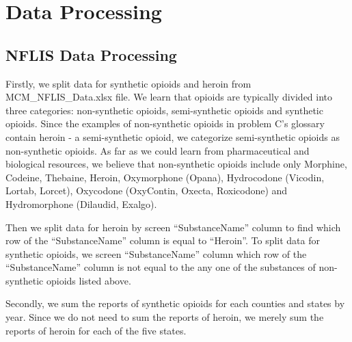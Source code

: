\documentclass{mcmthesis}
\numberwithin{equation}{section}
\numberwithin{figure}{section}
\numberwithin{table}{section}
\theoremstyle{mydef}
\newtheorem{mydef}{Definition}[section]
\begin{document}
%
%

\section{Data Processing}

\subsection{NFLIS Data Processing}

Firstly, we split data for synthetic opioids and heroin from MCM\_NFLIS\_Data.xlsx file. We learn that opioids are typically divided into three categories: non-synthetic opioids, semi-synthetic opioids and synthetic opioids. Since the examples of non-synthetic opioids in problem C's glossary contain heroin - a semi-synthetic opioid, we categorize semi-synthetic opioids as non-synthetic opioids. As far as we could learn from pharmaceutical and biological resources, we believe that non-synthetic opioids include only Morphine, Codeine, Thebaine, Heroin, Oxymorphone (Opana), Hydrocodone (Vicodin, Lortab, Lorcet),  Oxycodone (OxyContin, Oxecta, Roxicodone) and Hydromorphone (Dilaudid, Exalgo).

Then we split data for heroin by screen ``SubstanceName'' column to find  which row of the ``SubstanceName'' column is equal to ``Heroin''. To split data for synthetic opioids, we screen ``SubstanceName'' column which row of the ``SubstanceName'' column is not equal to the any one of the substances of non-synthetic opioids listed above.

Secondly, we sum the reports of synthetic opioids for each counties and states by year. Since we do not need to sum the reports of heroin, we merely sum the reports of heroin for each of the five states.
\end{document}
